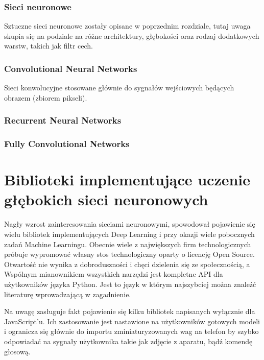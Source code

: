 \documentclass[12pt,a4paper,twoside,titlepage,openright]{book}
\begin{document}
\subsection{Sieci neuronowe}
Sztuczne sieci neuronowe zostały opisane w poprzednim rozdziale, tutaj uwaga skupia się na podziale na różne architektury, głębokości oraz rodzaj dodatkowych warstw, takich jak filtr cech.

\subsection{Convolutional Neural Networks}
Sieci konwolucyjne stosowane głównie do sygnałów wejściowych będących obrazem (zbiorem pikseli). 
\subsection{Recurrent Neural Networks}

\subsection{Fully Convolutional Networks}


\chapter{Biblioteki implementujące uczenie głębokich sieci neuronowych}
Nagły wzrost zainteresowania sieciami neuronowymi, spowodował pojawienie się wielu bibliotek implementujących Deep Learning i przy okazji wiele pobocznych zadań Machine Learningu. Obecnie wiele z największych firm technologicznych próbuje wypromować własny stos technologiczny oparty o licencję Open Source. Otwartość nie wynika z dobroduszności i chęci dzielenia się ze społecznością, a  Wspólnym mianownikiem wszystkich narzędzi jest kompletne API dla użytkowników języka Python. Jest to język w którym najszybciej można znaleźć literaturę wprowadzającą w zagadnienie.

Na uwagę zasługuje fakt pojawienie się kilku bibliotek napisanych wyłącznie dla JavaScript'u. Ich zastosowanie jest nastawione na użytkowników gotowych modeli i ogranicza się głównie do importu zminiaturyzowanych wag na telefon by szybko odpowiadać na sygnały użytkownika takie jak zdjęcie z aparatu, bądź komendę głosową. 
\end{document}
